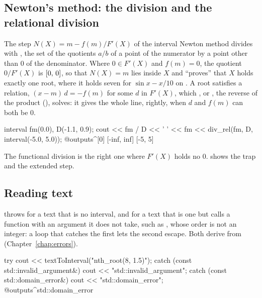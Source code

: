 \subsection{Newton's method: the division and the relational division}
%

The step $N(X)=m-f(m)/F'(X)$ of the interval Newton method divides with
\code{/}, the set of the quotients $a/b$ of a point of the numerator by a point
other than 0 of the denominator. Where $0\in F'(X)$ and $f(m)=0$, the quotient
$0/F'(X)$ is $[0,\,0]$, so that $N(X)=m$ lies inside $X$ and ``proves''
that $X$ holds exactly one root, where it holds seven for $\sin x-x/10$ on
. A root satisfies a relation, $(x-m)\,d=-f(m)$ for some $d$ in
$F'(X)$, which \code{\%}, or , the reverse of the product
(), solves: it gives the whole line, rightly,
when $d$ and $f(m)$ can both be 0.

\begin{example}
interval fm(0.0), D(-1.1, 0.9);
cout << fm / D << ' ' << fm %
     << div_rel(fm, D, interval(-5.0, 5.0));
@outputs^[0] [-inf, inf] [-5, 5]~
\end{example}

\noindent
The functional division is the right one where $F'(X)$ holds no 0.
 shows the trap and the extended step.

\subsection{Reading text}
%

 throws  for a text
that is no interval, and  for a text that is one but
calls a function with an argument it does not take, such as
, whose order is not an integer: a loop that catches
the first lets the second escape. Both derive from 
(Chapter~\ref{chap:errors}).\newinvfive

\begin{example}
try {
  cout << textToInterval("nth_root(8, 1.5)");
} catch (const std::invalid_argument&) {
  cout << "std::invalid_argument";
} catch (const std::domain_error&) {
  cout << "std::domain_error";
}
@outputs^std::domain_error~
\end{example}

